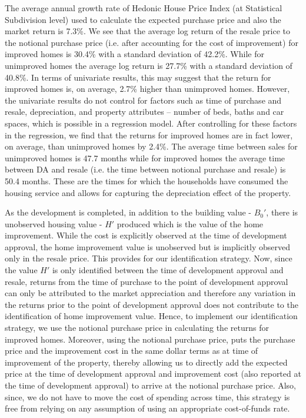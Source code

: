 \documentclass[AEJ,reqno, draftmode]{AEA} %
\begin{document}
The average annual growth rate of Hedonic House Price Index (at Statistical Subdivision level) used to calculate the expected purchase price and also the market return is 7.3\%. We see that the average log return of the resale price to the notional purchase price (i.e. after accounting for the cost of improvement) for improved homes is 30.4\% with a standard deviation of 42.2\%. While for unimproved homes the average log return is 27.7\% with a standard deviation of 40.8\%. In terms of univariate results, this may suggest that the return for improved homes is, on average, 2.7\% higher than unimproved homes. However, the univariate results do not control for factors such as time of purchase and resale, depreciation, and property attributes -- number of beds, baths and car spaces, which is possible in a regression model. After controlling for these factors in the regression, we find that the returns for improved homes are in fact lower, on average, than unimproved homes by 2.4\%. The average time between sales for unimproved homes is 47.7 months while for improved homes the average time between DA and resale (i.e. the time between notional purchase and resale) is 50.4 months. These are the times for which the households have consumed the housing service and allows for capturing the depreciation effect of the property.




As the development is completed, in addition to the building value - $B_0'$, there is unobserved housing value - $H'$ produced which is the value of the home improvement. While the cost is explicitly observed at the time of development approval, the home improvement value is unobserved but is implicitly observed only in the resale price. This provides for our identification strategy. Now, since the value $H'$ is only identified between the time of development approval and resale, returns from the time of purchase to the point of development approval can only be attributed to the market appreciation and therefore any variation in the returns prior to the point of development approval does not contribute to the identification of home improvement value. Hence, to implement our identification strategy, we use the notional purchase price in calculating the returns for improved homes. Moreover, using the notional purchase price, puts the purchase price and the improvement cost in the same dollar terms as at time of improvement of the property, thereby allowing us to directly add the expected price at the time of development approval and improvement cost (also reported at the time of development approval) to arrive at the notional purchase price. Also, since, we do not have to move the cost of spending across time, this strategy is free from relying on any assumption of using an appropriate cost-of-funds rate. 
\end{document}
